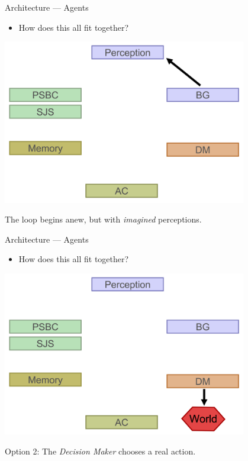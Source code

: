 \documentclass{beamer}
\begin{document}
   \begin{frame}{Architecture --- Agents}
      \begin{itemize}
         \item {How does this all fit together?}
      \end{itemize}
      
      \begin{center}
         \includegraphics[width=0.8\textwidth]{plan_4.png}
      \end{center}
      
      The loop begins anew, but with \emph{imagined} perceptions.
   \end{frame}
   
   \begin{frame}{Architecture --- Agents}
      \begin{itemize}
         \item {How does this all fit together?}
      \end{itemize}
      
      \begin{center}
         \includegraphics[width=0.8\textwidth]{plan_5.png}
      \end{center}
      
      Option 2: The \emph{Decision Maker} chooses a real action.
   \end{frame}
   
\end{document}
